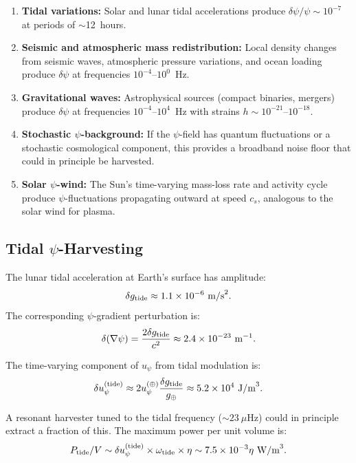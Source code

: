 \documentclass[aps,prd,twocolumn,showpacs,preprintnumbers,superscriptaddress,nofootinbib]{revtex4-2}
\begin{document}
\begin{enumerate}
\item \textbf{Tidal variations:} Solar and lunar tidal accelerations
produce $\delta\psi/\psi \sim 10^{-7}$ at periods of $\sim$12~hours.

\item \textbf{Seismic and atmospheric mass redistribution:} Local density
changes from seismic waves, atmospheric pressure variations, and ocean
loading produce $\delta\psi$ at frequencies $10^{-4}$--$10^0$~Hz.

\item \textbf{Gravitational waves:} Astrophysical sources (compact
binaries, mergers) produce $\delta\psi$ at frequencies
$10^{-4}$--$10^4$~Hz with strains $h \sim 10^{-21}$--$10^{-18}$.

\item \textbf{Stochastic $\psi$-background:} If the $\psi$-field has
quantum fluctuations or a stochastic cosmological component, this
provides a broadband noise floor that could in principle be harvested.

\item \textbf{Solar $\psi$-wind:} The Sun's time-varying mass-loss rate
and activity cycle produce $\psi$-fluctuations propagating outward at
speed $c_s$, analogous to the solar wind for plasma.
\end{enumerate}

\subsection{Tidal $\psi$-Harvesting}\label{sec:tidal}

The lunar tidal acceleration at Earth's surface has amplitude:
\begin{equation}
\delta g_{\rm tide} \approx 1.1\times 10^{-6}~\text{m/s}^2.
\end{equation}
The corresponding $\psi$-gradient perturbation is:
\begin{equation}
\delta(\nabla\psi) = \frac{2\delta g_{\rm tide}}{c^2} \approx 2.4\times 10^{-23}~\text{m}^{-1}.
\end{equation}

The time-varying component of $u_\psi$ from tidal modulation is:
\begin{equation}
\delta u_\psi^{(\rm tide)} \approx 2u_\psi^{(\oplus)}\frac{\delta g_{\rm tide}}{g_\oplus} \approx 5.2\times 10^4~\text{J/m}^3.
\end{equation}

A resonant harvester tuned to the tidal frequency ($\sim 23~\mu$Hz)
could in principle extract a fraction of this.  The maximum power
per unit volume is:
\begin{equation}
P_{\rm tide}/V \sim \delta u_\psi^{(\rm tide)}\times\omega_{\rm tide}\times\eta \sim 7.5\times 10^{-3}\eta~\text{W/m}^3.
\end{equation}
\end{document}
